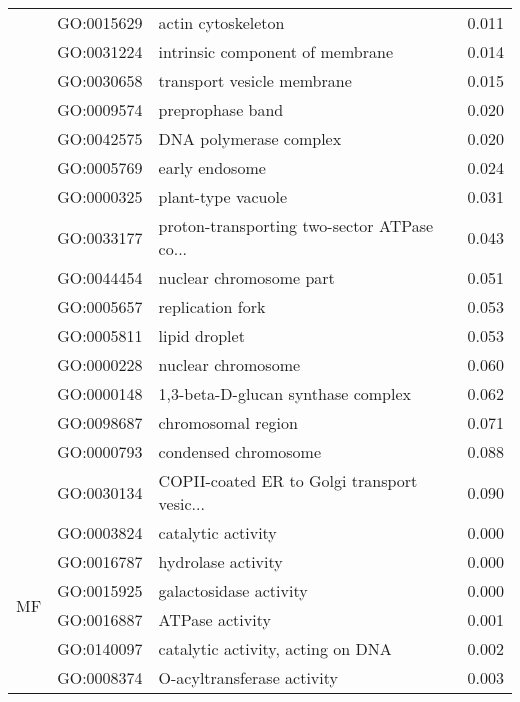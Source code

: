 \begin{longtable}{lllr}
   & GO:0015629 &                           actin cytoskeleton &         0.011 \\
   & GO:0031224 &              intrinsic component of membrane &         0.014 \\
   & GO:0030658 &                   transport vesicle membrane &         0.015 \\
   & GO:0009574 &                             preprophase band &         0.020 \\
   & GO:0042575 &                       DNA polymerase complex &         0.020 \\
   & GO:0005769 &                               early endosome &         0.024 \\
   & GO:0000325 &                           plant-type vacuole &         0.031 \\
   & GO:0033177 &  proton-transporting two-sector ATPase co... &         0.043 \\
   & GO:0044454 &                      nuclear chromosome part &         0.051 \\
   & GO:0005657 &                             replication fork &         0.053 \\
   & GO:0005811 &                                lipid droplet &         0.053 \\
   & GO:0000228 &                           nuclear chromosome &         0.060 \\
   & GO:0000148 &           1,3-beta-D-glucan synthase complex &         0.062 \\
   & GO:0098687 &                           chromosomal region &         0.071 \\
   & GO:0000793 &                         condensed chromosome &         0.088 \\
   & GO:0030134 &  COPII-coated ER to Golgi transport vesic... &         0.090 \\
\cline{1-4}
\multirow{92}{*}{MF} & GO:0003824 &                           catalytic activity &         0.000 \\
   & GO:0016787 &                           hydrolase activity &         0.000 \\
   & GO:0015925 &                       galactosidase activity &         0.000 \\
   & GO:0016887 &                              ATPase activity &         0.001 \\
   & GO:0140097 &            catalytic activity, acting on DNA &         0.002 \\
   & GO:0008374 &                   O-acyltransferase activity &         0.003 \\

\end{longtable}
